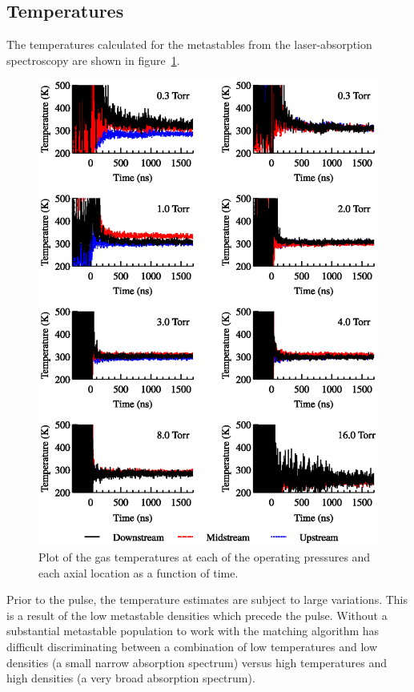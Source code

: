 \subsection{Temperatures}

The temperatures calculated for the metastables from the laser-absorption
spectroscopy are shown in figure~\ref{fig:temperatures}.
\begin{figure}
  \centering
  \includegraphics{./chapters/metastables/figures/temperatures.eps}
  \caption{Plot of the gas temperatures at each of the operating
  pressures and each axial location as a function of time.}
  \label{fig:temperatures}
\end{figure}
Prior to the pulse, the temperature estimates are subject to large variations.
This is a result of the low metastable densities which precede the pulse.
Without a substantial metastable population to work with the matching algorithm
has difficult discriminating between a combination of low temperatures and low
densities (a small narrow absorption spectrum) versus high temperatures and high
densities (a very broad absorption spectrum).

